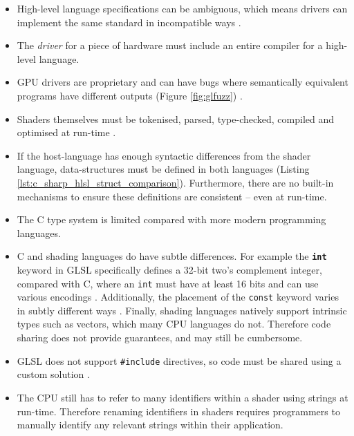 \documentclass[a4paper,12pt,twoside,openright]{report}
\begin{document}
\begin{itemize}

    \item High-level language specifications can be ambiguous, which means
    drivers can implement the same standard in incompatible ways
    \cite{NVIDIAInternshipLessons}.

    \item The \textit{driver} for a piece of hardware must include an entire
    compiler for a high-level language.

    \item GPU drivers are proprietary and can have bugs where semantically
    equivalent programs have different outputs (Figure \ref{fig:glfuzz})
    \cite{GLFuzz}.

    \item Shaders themselves must be tokenised, parsed, type-checked, compiled
    and optimised at run-time \cite{TripThroughGraphicsPipeline1}.

    \item If the host-language has enough syntactic differences from the shader
    language, data-structures must be defined in both languages (Listing
    \ref{lst:c_sharp_hlsl_struct_comparison}). Furthermore, there are no
    built-in mechanisms to ensure these definitions are consistent -- even at
    run-time.

    \item The C type system is limited compared with more modern programming
    languages.

    \item C and shading languages do have subtle differences. For example the
    \textbf{\texttt{int}} keyword in GLSL specifically defines a 32-bit two's
    complement integer, compared with C, where an \texttt{int} must have at
    least 16 bits and can use various encodings \cite{FundementalTypes}.
    Additionally, the placement of the \texttt{const} keyword varies in subtly
    different ways \cite{FundementalTypesGLSL}. Finally, shading languages
    natively support intrinsic types such as vectors, which many CPU languages
    do not. Therefore code sharing does not provide guarantees, and may still
    be cumbersome.

    \item GLSL does not support \texttt{\#include} directives, so code must be
    shared using a custom solution \cite{NoIncludeGLSL}.

    \item The CPU still has to refer to many identifiers within a shader using
    strings at run-time. Therefore renaming identifiers in shaders requires
    programmers to manually identify any relevant strings within their
    application.

\end{itemize}
\end{document}
